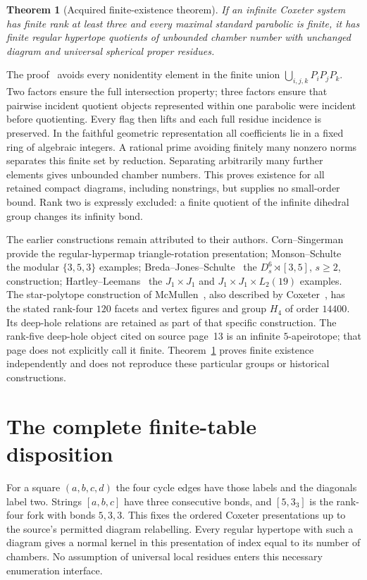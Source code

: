 \documentclass[11pt,a4paper]{article}
\newtheorem{theorem}{Theorem}
\begin{document}
\begin{theorem}[Acquired finite-existence theorem]\label{exist}
If an infinite Coxeter system has finite rank at least three and every
maximal standard parabolic is finite, it has finite regular hypertope
quotients of unbounded chamber number with unchanged diagram and universal
spherical proper residues.
\end{theorem}
The proof~\cite{existence} avoids every nonidentity element in the finite
union $\bigcup_{i,j,k}P_iP_jP_k$. Two factors ensure the full intersection
property; three factors ensure that pairwise incident quotient objects
represented within one parabolic were incident before quotienting. Every
flag then lifts and each full residue incidence is preserved. In the
faithful geometric representation all coefficients lie in a fixed ring of
algebraic integers. A rational prime avoiding finitely many nonzero norms
separates this finite set by reduction. Separating arbitrarily many further
elements gives unbounded chamber numbers. This proves existence for all
retained compact diagrams, including nonstrings, but supplies no small-order
bound. Rank two is expressly excluded: a finite quotient of the infinite
dihedral group changes its infinity bond.

The earlier constructions remain attributed to their authors.
Corn--Singerman~\cite{Corn} provide the regular-hypermap triangle-rotation
presentation; Monson--Schulte~\cite{Monson} the modular $\{3,5,3\}$ examples;
Breda--Jones--Schulte~\cite{Breda} the $D_s^6\rtimes[3,5]$, $s\ge2$,
construction; Hartley--Leemans~\cite{Hartley} the $J_1\times J_1$ and
$J_1\times J_1\times L_2(19)$ examples. The star-polytope construction
of McMullen~\cite{Star}, also described by Coxeter~\cite{CoxeterPoly},
has the stated rank-four $120$ facets and vertex figures and group $H_4$
of order $14400$. Its deep-hole relations are retained as part of that
specific construction. The rank-five deep-hole object cited on source
page~13 is an infinite $5$-apeirotope; that page does not explicitly call
it finite. Theorem~\ref{exist} proves finite existence independently and
does not reproduce these particular groups or historical constructions.

\section{The complete finite-table disposition}\label{finite}
For a square $(a,b,c,d)$ the four cycle edges have those labels and the
diagonals label two. Strings $[a,b,c]$ have three consecutive bonds, and
$[5,3_3]$ is the rank-four fork with bonds $5,3,3$. This fixes the ordered
Coxeter presentations up to the source's permitted diagram relabelling.
Every regular hypertope with such a diagram gives a normal kernel in this
presentation of index equal to its number of chambers. No assumption of
universal local residues enters this necessary enumeration interface.
\end{document}
